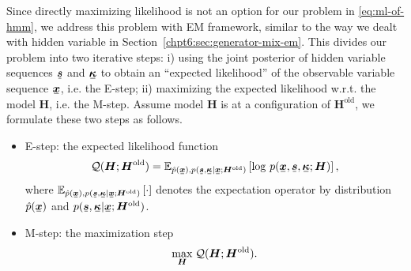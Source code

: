 Since directly maximizing likelihood is not an option for our problem in \eqref{eq:ml-of-hmm}, we address this problem with EM framework, similar to the way we dealt with hidden variable in Section~\ref{chpt6:sec:generator-mix-em}. This divides our problem into  two iterative steps: i) using the joint posterior of hidden variable sequences $\ubm{s}$ and $\ubm{\kappa}$ to obtain an ``expected likelihood'' of the observable variable sequence $\ubm{x}$, i.e. the E-step; ii) maximizing the expected likelihood w.r.t. the model $\bm{H}$, i.e. the M-step. Assume model $\bm{H}$ is at a configuration of $\bm{H}^{\mathrm{old}}$, we formulate these two steps as follows.
\begin{itemize}
\item E-step: %
  the expected likelihood function
  \begin{equation}\label{eq:em-q-funciton}
    \Qq(\bm{H}; \bm{H}^{\mathrm{old}}) = \EE_{\hat{p}(\ubm{x}),p(\ubm{s},\ubm{\kappa}| \ubm{x}; \bm{H}^{\mathrm{old}})}\left[ \log\,p(\ubm{x}, \ubm{s}, \ubm{\kappa}; \bm{H})\right],
  \end{equation}
  where $\EE_{\hat{p}(\ubm{x}),p(\ubm{s},\ubm{\kappa}| \ubm{x}; \bm{H}^{\mathrm{old}})}\left[ \cdot\right]$ denotes the expectation operator by distribution $\hat{p}(\ubm{x})$ and $p(\ubm{s},\ubm{\kappa}| \ubm{x}; \bm{H}^{\mathrm{old}})$.
\item M-step: the maximization step
  \begin{equation}\label{eq:em-m-opt}
    \underset{\bm{H}}{\max}\; \mathcal{Q}(\bm{H}; \bm{H}^{\mathrm{old}}).
  \end{equation}
\end{itemize}


